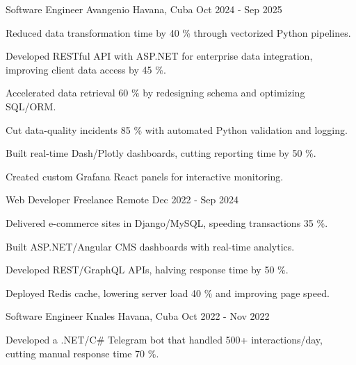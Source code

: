 \documentclass[]{awesome-cv}
\begin{document}
\begin{cventries}
  \cventry
    {Software Engineer}
    {Avangenio}
    {Havana, Cuba}
    {Oct 2024 - Sep 2025}
    {\begin{cvitems}
        \item Reduced data transformation time by 40 \% through vectorized Python pipelines.
        \item Developed RESTful API with ASP.NET for enterprise data integration, improving client data access by 45 \%.
        \item Accelerated data retrieval 60 \% by redesigning schema and optimizing SQL/ORM.
        \item Cut data-quality incidents 85 \% with automated Python validation and logging.
        \item Built real-time Dash/Plotly dashboards, cutting reporting time by 50 \%.
        \item Created custom Grafana React panels for interactive monitoring.
      \end{cvitems}}

  \cventry
    {Web Developer}
    {Freelance}
    {Remote}
    {Dec 2022 - Sep 2024}
    {\begin{cvitems}
        \item Delivered e-commerce sites in Django/MySQL, speeding transactions 35 \%.
        \item Built ASP.NET/Angular CMS dashboards with real-time analytics.
        \item Developed REST/GraphQL APIs, halving response time by 50 \%.
        \item Deployed Redis cache, lowering server load 40 \% and improving page speed.
      \end{cvitems}}

  \cventry
    {Software Engineer}
    {Knales}
    {Havana, Cuba}
    {Oct 2022 - Nov 2022}
    {\begin{cvitems}
        \item Developed a .NET/C\# Telegram bot that handled 500+ interactions/day, cutting manual response time 70 \%.
      \end{cvitems}}
\end{cventries}
\end{document}
